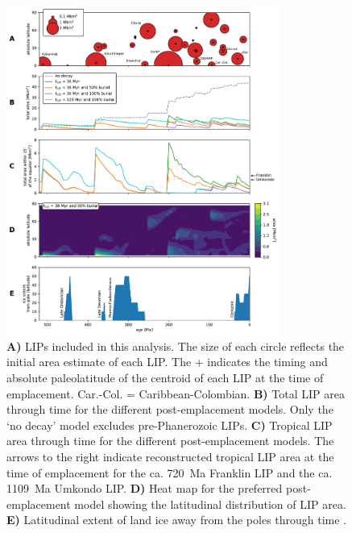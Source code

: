 \documentclass[11pt,letterpaper]{article}
\begin{document}
\begin{figure}[h!]
\begin{center}
	\includegraphics[width=0.8\textwidth]{Manuscript/Figures/LIP_Areas.pdf}
	\caption{\textbf{A)} LIPs included in this analysis. The size of each circle reflects the initial area estimate of each LIP. The + indicates the timing and absolute paleolatitude of the centroid of each LIP at the time of emplacement. Car.-Col. = Caribbean-Colombian. \textbf{B)} Total LIP area through time for the different post-emplacement models. Only the `no decay' model excludes pre-Phanerozoic LIPs. \textbf{C)} Tropical LIP area through time for the different post-emplacement models. The arrows to the right indicate reconstructed tropical LIP area at the time of emplacement for the ca. 720~Ma Franklin LIP and the ca. 1109~Ma Umkondo LIP. \textbf{D)} Heat map for the preferred post-emplacement model showing the latitudinal distribution of LIP area. \textbf{E)} Latitudinal extent of land ice away from the poles through time \citep{Macdonald2018a}.}
	\label{fig:LIP_area}
\end{center}
\end{figure}
\end{document}
